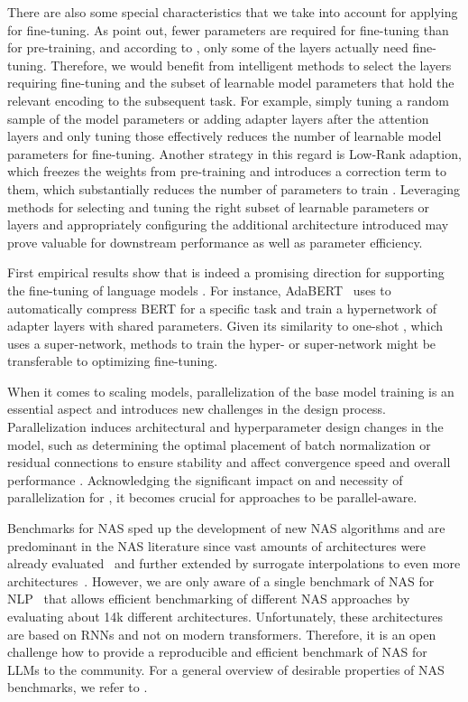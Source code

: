 There are also some special characteristics that we take into account for applying \NAS for fine-tuning.
As \citet{aghajanyan-acl21} point out, fewer parameters are required for fine-tuning than for pre-training, and according to \citet{lee-arxiv19}, only some of the layers actually need fine-tuning.
Therefore, we would benefit from intelligent methods to select the layers requiring fine-tuning and the subset of learnable model parameters that hold the relevant encoding to the subsequent task. For example, simply tuning a random sample of the model parameters \cite{aghajanyan-acl21} or adding adapter layers after the attention layers and only tuning those \cite{houlsby-icml19} effectively reduces the number of learnable model parameters for fine-tuning. Another strategy in this regard is Low-Rank adaption, which freezes the weights from pre-training and introduces a correction term to them, which substantially reduces the number of parameters to train \cite{hu-iclr22a}.
Leveraging \AutoML methods for selecting and tuning the right subset of learnable parameters or layers and appropriately configuring the additional architecture introduced may prove valuable for downstream performance as well as parameter efficiency.

First empirical results show that \NAS is indeed a promising direction for supporting the fine-tuning of language models \cite{chitty-ieeea22a}.
For instance, AdaBERT~\cite{chen-ijcai20} uses \NAS to automatically compress BERT for a specific task and
\citet{mahabadi-acl21} train a hypernetwork of adapter layers with shared parameters. 
Given its similarity to one-shot \NAS \cite{bender-icml18a,brock-iclr18a,shi-neurips20a}, which uses a super-network, methods to train the hyper- or super-network might be transferable to optimizing \LLM fine-tuning. 

When it comes to scaling models, parallelization of the base model training is an essential aspect and introduces new challenges in the design process.
Parallelization induces architectural and hyperparameter design changes in the model, such as determining the optimal placement of batch normalization or residual connections to ensure stability and affect convergence speed and overall performance \cite{shoeybi-arxiv2019a}. 
Acknowledging the significant impact on and necessity of parallelization for \LLMs, it becomes crucial for \NAS approaches to be parallel-aware.

Benchmarks for NAS sped up the development of new NAS algorithms and are predominant in the NAS literature since vast amounts of architectures were already evaluated~\cite{ying-icml19a,dong-iclr20a,mehta-iclr22a} and further extended by surrogate interpolations to even more architectures~\cite{zela-iclr22a}.
However, we are only aware of a single benchmark of NAS for NLP~\cite{klyuchnikov-tfas22a} that allows efficient benchmarking of different NAS approaches by evaluating about 14k different architectures. Unfortunately, these architectures are based on RNNs and not on modern transformers. Therefore, it is an open challenge how to provide a reproducible and efficient benchmark of NAS for LLMs to the community.
For a general overview of desirable properties of NAS benchmarks, we refer to \citet{lindauer-jmlr20a}.

